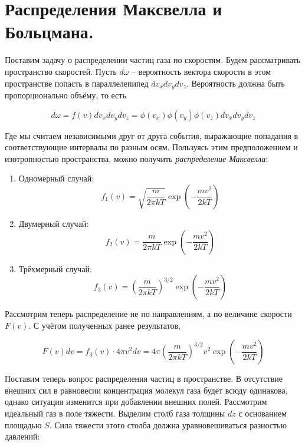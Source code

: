 \section{Распределения Максвелла и Больцмана.}

Поставим задачу о распределении частиц газа по скоростям. Будем рассматривать пространство скоростей. Пусть $d \omega$ -- вероятность вектора скорости в этом пространстве попасть в параллелепипед $dv_x dv_y dv_z$. Вероятность должна быть пропорционально объёму, то есть

\begin{equation*}
        d \omega = f(v) dv_x dv_y dv_z = \phi (v_x) \phi (v_y) \phi (v_z) dv_x dv_y dv_z
\end{equation*}

\noindent
Где мы считаем независимыми друг от друга события, выражающие попадания в соответствующие интервалы по разным осям. Пользуясь этим предположением и изотропностью пространства, можно получить \textit{распределение Максвелла}:

\begin{enumerate}
    \item Одномерный случай:
    \begin{equation}
        f_1 (v) = \sqrt{\frac{m}{2 \pi k T}} \exp \left( -\frac{m v^2}{2 k T} \right)
    \end{equation}
    \item Двумерный случай:
    \begin{equation}
        f_2 (v) = \frac{m}{2 \pi k T} \exp \left( -\frac{m v^2}{2 k T} \right)
    \end{equation}
    \item Трёхмерный случай:
    \begin{equation}
        f_3 (v) = \left( \frac{m}{2 \pi k T} \right)^{3/2} \exp \left( -\frac{m v^2}{2 k T} \right)
    \end{equation}
\end{enumerate}

Рассмотрим теперь распределение не по направлениям, а по величине скорости $F(v)$. С учётом полученных ранее результатов,

\begin{equation}
    F(v) dv = f_3(v) \cdot 4 \pi v^2 dv = 4 \pi \left( \frac{m}{2 \pi k T} \right)^{3/2} v^2 \exp \left( -\frac{m v^2}{2 k T} \right)
\end{equation}

Поставим теперь вопрос распределения частиц в пространстве. В отсутствие внешних сил в равновесии концентрация молекул газа будет всюду одинакова, однако ситуация изменится при добавлении внешних полей. Рассмотрим идеальный газ в поле тяжести. Выделим столб газа толщины $dz$ с основанием площадью $S$. Сила тяжести этого столба должна уравновешиваться разностью давлений:

